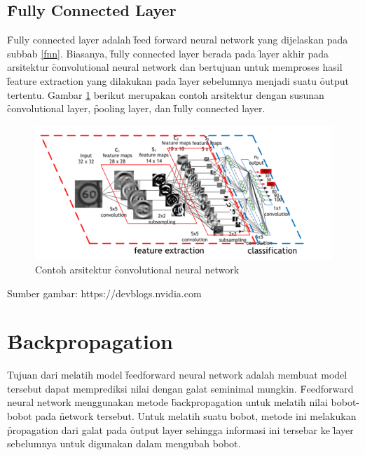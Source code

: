 \subsection{\f{Fully Connected Layer}}
\f{Fully connected layer} adalah \f{feed forward neural network} yang dijelaskan pada subbab \ref{fnn}. Biasanya, \f{fully connected layer} berada pada \f{layer} akhir pada arsitektur \f{convolutional neural network} dan bertujuan untuk memproses hasil \f{feature extraction} yang dilakukan pada \f{layer} sebelumnya menjadi suatu \f{output} tertentu. Gambar \ref{fig:cnnlayers} berikut merupakan contoh arsitektur dengan susunan \f{convolutional layer}, \f{pooling layer}, dan \f{fully connected layer}.

\begin{figure}
	\centering
	\includegraphics[width=1\textwidth,height=0.45\textwidth]
	{pics/cnnlayers.png}
	\caption{Contoh arsitektur \f{convolutional neural network}}
	\label{fig:cnnlayers}
\end{figure}
\vspace{-1.2cm}
\begin{center}
	{\small Sumber gambar: https://devblogs.nvidia.com}
\end{center}
\section{\f{Backpropagation}}
Tujuan dari melatih model \f{feedforward neural network} adalah membuat model tersebut dapat memprediksi nilai dengan galat seminimal mungkin. \f{Feedforward neural network} menggunakan metode \f{backpropagation} untuk melatih nilai bobot-bobot pada \f{network} tersebut. Untuk melatih suatu bobot, metode ini melakukan \f{propagation} dari galat pada \f{output layer} sehingga informasi ini tersebar ke \f{layer} sebelumnya untuk digunakan dalam mengubah bobot.

